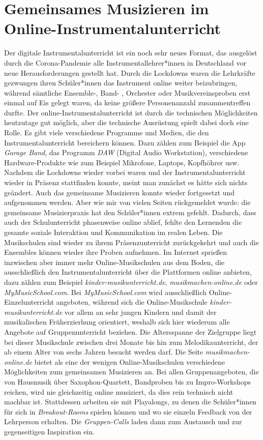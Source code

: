 \section{Gemeinsames Musizieren im Online-Instrumentalunterricht}

Der digitale Instrumentalunterricht ist ein noch sehr neues Format, das
ausgelöst durch die Corona-Pandemie alle Instrumentallehrer*innen in Deutschland
vor neue Herausforderungen gestellt hat. Durch die Lockdowns waren die
Lehrkräfte gezwungen ihren Schüler*innen das Instrument online weiter
beizubringen, während sämtliche Ensemble-, Band- , Orchester oder
Musikvereinsproben erst einmal auf Eis gelegt waren, da keine größere
Personenanzahl zusammentreffen durfte. Der online-Instrumentalunterricht ist
durch die technischen Möglichkeiten heutzutage gut möglich, aber die technische
Ausrüstung spielt dabei doch eine Rolle. Es gibt viele verschiedene Programme
und Medien, die den Instrumentalunterricht bereichern können. Dazu zählen zum
Beispiel die App \emph{Garage Band}, das Programm \emph{DAW} (Digital Audio
Workstation), verschiedene Hardware-Produkte wie zum Beispiel Mikrofone,
Laptops, Kopfhöhrer usw. Nachdem die Lockdowns wieder vorbei waren und der
Instrumentalunterricht wieder in Präsenz stattfinden konnte, meint man zunächst
es hätte sich nichts geändert. Auch das gemeinsame Musizieren konnte wieder
fortgesetzt und aufgenommen werden. Aber wie mir von vielen Seiten rückgemeldet
wurde: die gemeinsame Musizierpraxis hat den Schüler*innen extrem gefehlt.
Dadurch, dass auch der Schulunterricht phasenweise online ablief, fehlte den
Lernenden die gesamte soziale Interaktion und Kommunikation im realen Leben. Die
Musikschulen sind wieder zu ihrem Präsenzunterricht zurückgekehrt und auch die
Ensembles können wieder ihre Proben aufnehmen. Im Internet sprießen inzwischen
aber immer mehr Online-Musikschulen aus dem Boden, die ausschließlich den
Instrumentalunterricht über die Plattformen online anbieten, dazu zählen zum
Beispiel \emph{kinder-musikunterricht.de}, \emph{musikmachen-online.de} oder
\emph{MyMusicSchool.com}. Bei \emph{MyMusicSchool.com} wird ausschließlich
Online-Einzelunterricht angeboten, während sich die Online-Musikschule
\emph{kinder-musikunterricht.de} vor allem an sehr jungen Kindern und damit der
musikalischen Früherzierhung orientiert, weshalb sich hier wiederum alle
Angebote auf Gruppenunterricht beziehen. Die Altersspanne der Zielgruppe liegt
bei dieser Musikschule zwischen drei Monate bis hin zum Melodikaunterricht, der
ab einem Alter von sechs Jahren besucht werden darf.
\autocite{online_musikschule_emp} Die Seite \emph{musikmachen-online.de} bietet
als eine der wenigen Online-Musikschulen verschiedene Möglichkeiten zum
gemeinsamen Musizieren an. \autocite{online_musikschule_mmo} Bei allen
Gruppenangeboten, die von Hausmusik über Saxophon-Quartett, Bandproben bis zu
Impro-Workshops reichen, wird nie gleichzeitig online musiziert, da dies rein
technisch nicht machbar ist. Stattdessen arbeiten sie mit Playalongs, zu denen
die Schüler*innen für sich in \emph{Breakout-Rooms} spielen können und wo sie
einzeln Feedback von der Lehrperson erhalten. Die \emph{Gruppen-Calls} laden
dann zum Austausch und zur gegenseitigen Inspiration ein.
\autocite{online_musikschule_mmo}



